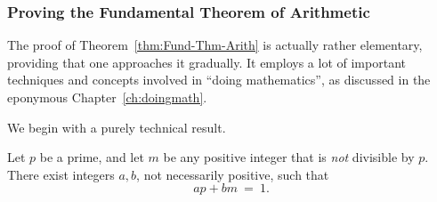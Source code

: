 \subsubsection{Proving the Fundamental Theorem of Arithmetic}

The  proof of Theorem~\ref{thm:Fund-Thm-Arith} is actually rather
elementary, providing that one approaches it gradually.  It
employs a lot of important techniques and concepts involved in ``doing
mathematics'', as discussed in the eponymous Chapter~\ref{ch:doingmath}.

We begin with a purely technical result.

\begin{prop}
\label{thm:p-n-linear}
Let $p$ be a prime, and let $m$ be any positive integer that is {\em
  not} divisible by $p$.  There exist integers $a, b$, not necessarily
positive, such that
\[ ap + bm \ = \ 1. \]
\end{prop}

